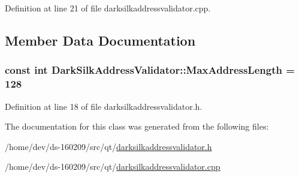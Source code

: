 Definition at line 21 of file darksilkaddressvalidator.\+cpp.



\subsection{Member Data Documentation}
\hypertarget{class_dark_silk_address_validator_ade0e41d2e163261099b876a880249519}{}
\subsubsection[{Max\+Address\+Length}]{\setlength{\rightskip}{0pt plus 5cm}const int Dark\+Silk\+Address\+Validator\+::\+Max\+Address\+Length = 128\hspace{0.3cm}{\ttfamily [static]}}\label{class_dark_silk_address_validator_ade0e41d2e163261099b876a880249519}


Definition at line 18 of file darksilkaddressvalidator.\+h.



The documentation for this class was generated from the following files\+:\begin{DoxyCompactItemize}
\item 
/home/dev/ds-\/160209/src/qt/\hyperlink{darksilkaddressvalidator_8h}{darksilkaddressvalidator.\+h}\item 
/home/dev/ds-\/160209/src/qt/\hyperlink{darksilkaddressvalidator_8cpp}{darksilkaddressvalidator.\+cpp}\end{DoxyCompactItemize}
